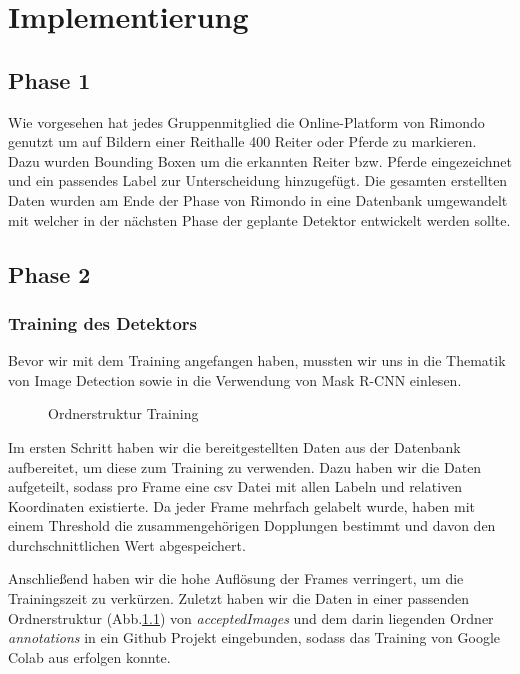 \chapter{Implementierung}
\label{ch:implementierung}

\section{Phase 1}
Wie vorgesehen hat jedes Gruppenmitglied die Online-Platform von Rimondo genutzt um auf Bildern einer Reithalle 400 Reiter oder Pferde zu markieren. Dazu wurden Bounding Boxen um die erkannten Reiter bzw. Pferde eingezeichnet und ein passendes Label zur Unterscheidung hinzugefügt. Die gesamten erstellten Daten wurden am Ende der Phase von Rimondo in eine Datenbank umgewandelt mit welcher in der nächsten Phase der geplante Detektor entwickelt werden sollte.

\section{Phase 2}
\subsection*{Training des Detektors}
Bevor wir mit dem Training angefangen haben, mussten wir uns in die Thematik von Image Detection sowie in die Verwendung von Mask R-CNN einlesen.

\begin{figure}
\caption{Ordnerstruktur Training}
\label{fig:folderstructure}
\end{figure}

Im ersten Schritt haben wir die bereitgestellten Daten aus der Datenbank aufbereitet, um diese zum Training zu verwenden. Dazu haben wir die Daten aufgeteilt, sodass pro Frame eine csv Datei mit allen Labeln und relativen Koordinaten existierte. Da jeder Frame mehrfach gelabelt wurde, haben mit einem Threshold die zusammengehörigen Dopplungen bestimmt und davon den durchschnittlichen Wert abgespeichert. 



Anschließend haben wir die hohe Auflösung der Frames verringert, um die Trainingszeit zu verkürzen. Zuletzt haben wir die Daten in einer passenden Ordnerstruktur (Abb.\ref{fig:folderstructure}) von \emph{ acceptedImages} und dem darin liegenden Ordner \emph{annotations} in ein Github Projekt eingebunden, sodass das Training von Google Colab aus erfolgen konnte.

